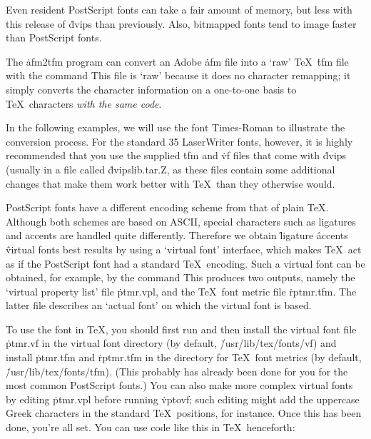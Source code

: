 Even resident PostScript fonts can take a fair amount of memory,
but less with this release of \.{dvips} than previously.  Also,
bitmapped fonts tend to image faster than PostScript fonts.


The \.{afm2tfm} program can convert an Adobe \.{afm} file into a `raw'
\TeX\ \.{tfm} file with the command
\noindent
This file is `raw' because it does no character remapping; it simply
converts the character information on a one-to-one basis to \TeX\
characters {\it with the same code}.

In the following examples, we will use the font Times-Roman to
illustrate the conversion process.  For the standard 35 LaserWriter
fonts, however, it is highly recommended that you use the supplied
\.{tfm} and \.{vf} files that come with \.{dvips} (usually in a
file called \.{dvipslib.tar.Z}, as these files contain some additional
changes that make them work better with \TeX\ than they otherwise
would.

PostScript fonts have a different encoding scheme from that of plain
\TeX. Although both schemes are based on ASCII, special characters such as
ligatures and accents are handled quite differently. Therefore we obtain
\^{ligature}
\^{accents}
\^{virtual fonts}
best results by using a `virtual font' interface, which makes \TeX\ act
as if the PostScript font had a standard \TeX\ encoding. Such a virtual
font can be obtained, for example, by the command
\noindent
This produces two outputs, namely the `virtual property list' file
\.{ptmr.vpl}, and the \TeX\ font metric file \.{rptmr.tfm}.
The latter file describes an `actual font' on which the virtual font is based.

To use the font in \TeX, you should first run
\noindent
and then install the virtual font file \.{ptmr.vf} in the virtual font
directory (by default, \.{/usr/lib/tex/fonts/vf}) and install \.{ptmr.tfm}
and \.{rptmr.tfm} in the directory for \TeX\ font metrics (by default,
\.{/usr/lib/tex/fonts/tfm}).  (This probably has already been done for you for
the most common PostScript fonts.)
You can also make more complex virtual fonts by editing
\.{ptmr.vpl} before running \.{vptovf}; such editing might add the uppercase
Greek characters in the standard \TeX\ positions, for instance.
Once this has been done, you're all set. You can use
code like this in \TeX\ henceforth:

